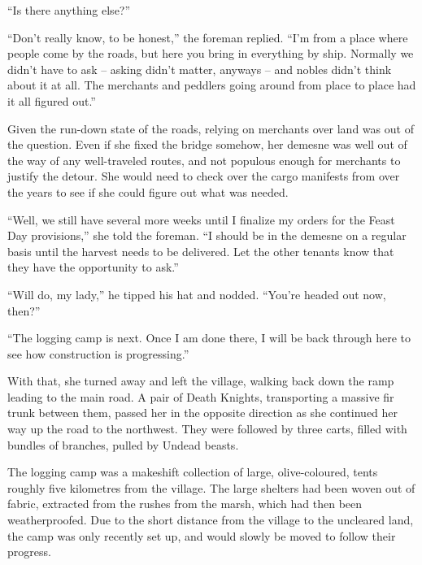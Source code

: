  

“Is there anything else?”

 

“Don’t really know, to be honest,” the foreman replied. “I’m from a place where people come by the roads, but here you bring in everything by ship. Normally we didn’t have to ask – asking didn’t matter, anyways – and nobles didn’t think about it at all. The merchants and peddlers going around from place to place had it all figured out.”

 

Given the run-down state of the roads, relying on merchants over land was out of the question. Even if she fixed the bridge somehow, her demesne was well out of the way of any well-traveled routes, and not populous enough for merchants to justify the detour. She would need to check over the cargo manifests from over the years to see if she could figure out what was needed.

 

“Well, we still have several more weeks until I finalize my orders for the Feast Day provisions,” she told the foreman. “I should be in the demesne on a regular basis until the harvest needs to be delivered. Let the other tenants know that they have the opportunity to ask.”

 

“Will do, my lady,” he tipped his hat and nodded. “You’re headed out now, then?”

 

“The logging camp is next. Once I am done there, I will be back through here to see how construction is progressing.”

 

With that, she turned away and left the village, walking back down the ramp leading to the main road. A pair of Death Knights, transporting a massive fir trunk between them, passed her in the opposite direction as she continued her way up the road to the northwest. They were followed by three carts, filled with bundles of branches, pulled by Undead beasts.

 

The logging camp was a makeshift collection of large, olive-coloured, tents roughly five kilometres from the village. The large shelters had been woven out of fabric, extracted from the rushes from the marsh, which had then been weatherproofed. Due to the short distance from the village to the uncleared land, the camp was only recently set up, and would slowly be moved to follow their progress.

